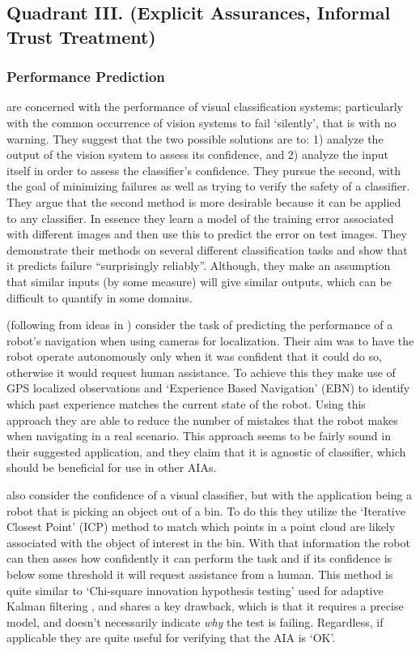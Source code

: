 \subsection{Quadrant III. (Explicit Assurances, Informal Trust Treatment)}\label{sec:q3}
\subsubsection{Performance Prediction} \label{sec:performance_prediction}
    \citet{Zhang2014-he} are concerned with the performance of visual classification systems; particularly with the common occurrence of vision systems to fail `silently', that is with no warning. They suggest that the two possible solutions are to: 1) analyze the output of the vision system to assess its confidence, and 2) analyze the input itself in order to assess the classifier's confidence. They pursue the second, with the goal of minimizing failures as well as trying to verify the safety of a classifier. They argue that the second method is more desirable because it can be applied to any classifier. In essence they learn a model of the training error associated with different images and then use this to predict the error on test images. They demonstrate their methods on several different classification tasks and show that it predicts failure ``surprisingly reliably''. Although, they make an assumption that similar inputs (by some measure) will give similar outputs, which can be difficult to quantify in some domains.

    \citet{Gurau2016-hs} (following from ideas in \citet{Churchill2015-ei}) consider the task of predicting the performance of a robot's navigation when using cameras for localization. Their aim was to have the robot operate autonomously only when it was confident that it could do so, otherwise it would request human assistance. To achieve this they make use of GPS localized observations and `Experience Based Navigation' (EBN) to identify which past experience matches the current state of the robot. Using this approach they are able to reduce the number of mistakes that the robot makes when navigating in a real scenario. This approach seems to be fairly sound in their suggested application, and they claim that it is agnostic of classifier, which should be beneficial for use in other AIAs.

    \citet{Kaipa2015-hy} also consider the confidence of a visual classifier, but with the application being a robot that is picking an object out of a bin. To do this they utilize the `Iterative Closest Point' (ICP) method to match which points in a point cloud are likely associated with the object of interest in the bin. With that information the robot can then asses how confidently it can perform the task and if its confidence is below some threshold it will request assistance from a human. This method is quite similar to `Chi-square innovation hypothesis testing' used for adaptive Kalman filtering \cite{Bar-Shalom2001-tg}, and shares a key drawback, which is that it requires a precise model, and doesn't necessarily indicate \emph{why} the test is failing. Regardless, if applicable they are quite useful for verifying that the AIA is `OK'.

